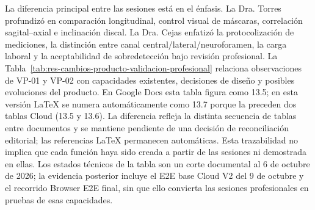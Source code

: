 La diferencia principal entre las sesiones está en el énfasis. La Dra. Torres profundizó en comparación longitudinal, control visual de máscaras, correlación sagital--axial e inclinación discal. La Dra. Cejas enfatizó la protocolización de mediciones, la distinción entre canal central/lateral/neuroforamen, la carga laboral y la aceptabilidad de sobredetección bajo revisión profesional.
La Tabla~\ref{tab:res-cambios-producto-validacion-profesional} relaciona observaciones de VP-01 y VP-02 con capacidades existentes, decisiones de diseño y posibles evoluciones del producto. En Google Docs esta tabla figura como 13.5; en esta versión LaTeX se numera automáticamente como 13.7 porque la preceden dos tablas Cloud (13.5 y 13.6). La diferencia refleja la distinta secuencia de tablas entre documentos y se mantiene pendiente de una decisión de reconciliación editorial; las referencias LaTeX permanecen automáticas. Esta trazabilidad no implica que cada función haya sido creada a partir de las sesiones ni demostrada en ellas. Los estados técnicos de la tabla son un corte documental al 6 de octubre de 2026; la evidencia posterior incluye el E2E base Cloud V2 del 9 de octubre y el recorrido Browser E2E final, sin que ello convierta las sesiones profesionales en pruebas de esas capacidades.
